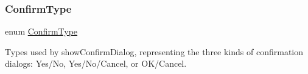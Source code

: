 \mbox{\label{classsgl_1_1GOptionPane_a6a1aaf19c06f5a6bef89ea6415547049}} 
\subsubsection{\texorpdfstring{Confirm\+Type}{ConfirmType}}
{\footnotesize\ttfamily enum \mbox{\hyperlink{classsgl_1_1GOptionPane_a6a1aaf19c06f5a6bef89ea6415547049}{Confirm\+Type}}}



Types used by show\+Confirm\+Dialog, representing the three kinds of confirmation dialogs\+: Yes/\+No, Yes/\+No/\+Cancel, or O\+K/\+Cancel. 

